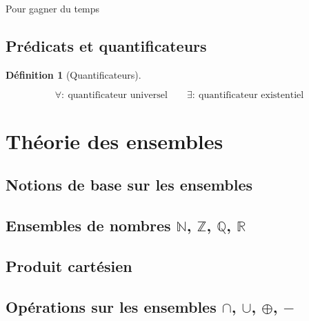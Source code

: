 \documentclass[
  letterpaper,
]{scrbook}
\theoremstyle{definition}
\newtheorem{definition}{Définition}[chapter]
\theoremstyle{definition}
\theoremstyle{remark}
\begin{document}
Pour gagner du temps

\hypertarget{pruxe9dicats-et-quantificateurs}{%
\section{Prédicats et
quantificateurs}\label{pruxe9dicats-et-quantificateurs}}

\leavevmode{}%
\begin{definition}[Quantificateurs]\label{def-quantificateurs}

\[
\forall:\ \text{quantificateur universel} \qquad \exists:\ \text{quantificateur existentiel}
\]

\end{definition}


\hypertarget{thuxe9orie-des-ensembles}{%
\chapter{Théorie des ensembles}\label{thuxe9orie-des-ensembles}}

\hypertarget{notions-de-base-sur-les-ensembles}{%
\section{Notions de base sur les
ensembles}\label{notions-de-base-sur-les-ensembles}}

\hypertarget{ensembles-de-nombres-mathbbn-mathbbz-mathbbq-mathbbr}{%
\section{\texorpdfstring{Ensembles de nombres \(\mathbb{N}\),
\(\mathbb{Z}\), \(\mathbb{Q}\),
\(\mathbb{R}\)}{Ensembles de nombres \textbackslash mathbb\{N\}, \textbackslash mathbb\{Z\}, \textbackslash mathbb\{Q\}, \textbackslash mathbb\{R\}}}\label{ensembles-de-nombres-mathbbn-mathbbz-mathbbq-mathbbr}}

\hypertarget{produit-cartuxe9sien}{%
\section{Produit cartésien}\label{produit-cartuxe9sien}}

\hypertarget{opuxe9rations-sur-les-ensembles-cap-cup-oplus--}{%
\section{\texorpdfstring{Opérations sur les ensembles \(\cap\),
\(\cup\), \(\oplus\),
\(-\)}{Opérations sur les ensembles \textbackslash cap, \textbackslash cup, \textbackslash oplus, -}}\label{opuxe9rations-sur-les-ensembles-cap-cup-oplus--}}
\end{document}
